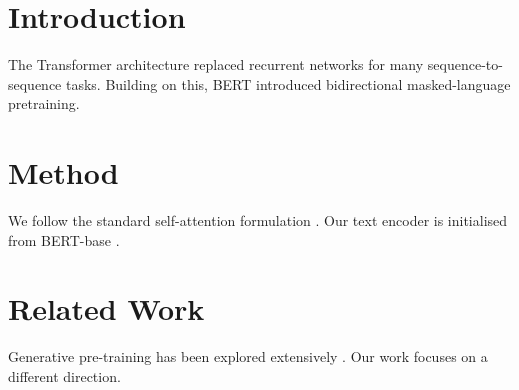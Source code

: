 \documentclass{article}
\begin{document}
\section{Introduction}
The Transformer architecture \cite{vaswani2017attention} replaced recurrent
networks for many sequence-to-sequence tasks. Building on this, BERT
\cite{devlin2019bert} introduced bidirectional masked-language pretraining.

\section{Method}
We follow the standard self-attention formulation \cite{vaswani2017attention}.
Our text encoder is initialised from BERT-base \cite{devlin2019bert}.

\section{Related Work}
Generative pre-training has been explored extensively
\cite{radford2019language}. Our work focuses on a different direction.



\end{document}
